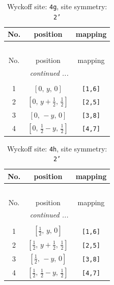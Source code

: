 \documentclass[fleqn,8pt]{jsarticle}
\begin{document}
\renewcommand{\arraystretch}{1.2}
\begin{longtable}{ccc}
\caption{Wyckoff site: {\tt 4g}, site symmetry: {\tt 2'}}
 \\
 \hline \hline
No. & position & mapping \\ \hline \endfirsthead

\multicolumn{2}{l}{\tablename\ \thetable{}} \\
 \hline \hline
No. & position & mapping \\ \hline \endhead

 \hline \hline
\multicolumn{2}{r}{\footnotesize\it continued ...} \\ \endfoot

 \hline \hline
\multicolumn{2}{r}{} \\ \endlastfoot

1 & $\left[ 0,\, y,\, 0 \right]$ & {\tt [1,6]} \\ \hline
2 & $\left[ 0,\, y + \frac{1}{2},\, \frac{1}{2} \right]$ & {\tt [2,5]} \\ \hline
3 & $\left[ 0,\, - y,\, 0 \right]$ & {\tt [3,8]} \\ \hline
4 & $\left[ 0,\, \frac{1}{2} - y,\, \frac{1}{2} \right]$ & {\tt [4,7]} \\
\end{longtable}
\renewcommand{\arraystretch}{1.2}
\begin{longtable}{ccc}
\caption{Wyckoff site: {\tt 4h}, site symmetry: {\tt 2'}}
 \\
 \hline \hline
No. & position & mapping \\ \hline \endfirsthead

\multicolumn{2}{l}{\tablename\ \thetable{}} \\
 \hline \hline
No. & position & mapping \\ \hline \endhead

 \hline \hline
\multicolumn{2}{r}{\footnotesize\it continued ...} \\ \endfoot

 \hline \hline
\multicolumn{2}{r}{} \\ \endlastfoot

1 & $\left[ \frac{1}{2},\, y,\, 0 \right]$ & {\tt [1,6]} \\ \hline
2 & $\left[ \frac{1}{2},\, y + \frac{1}{2},\, \frac{1}{2} \right]$ & {\tt [2,5]} \\ \hline
3 & $\left[ \frac{1}{2},\, - y,\, 0 \right]$ & {\tt [3,8]} \\ \hline
4 & $\left[ \frac{1}{2},\, \frac{1}{2} - y,\, \frac{1}{2} \right]$ & {\tt [4,7]} \\
\end{longtable}
\end{document}
